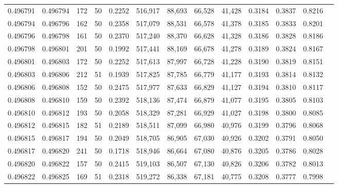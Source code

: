 \begin{tabular}{rrrrrrrrrrrrr}
0.496791 & 0.496794 &   172 &  50 &                                     0.2252 & 516,917 &  88,693 &  66,528 &  41,428 & 0.3184 & 0.3837 & 0.8216 \\
0.496794 & 0.496796 &   162 &  50 &                                     0.2358 & 517,079 &  88,531 &  66,578 &  41,378 & 0.3185 & 0.3833 & 0.8201 \\
0.496796 & 0.496798 &   161 &  50 &                                     0.2370 & 517,240 &  88,370 &  66,628 &  41,328 & 0.3186 & 0.3828 & 0.8186 \\
0.496798 & 0.496801 &   201 &  50 &                                     0.1992 & 517,441 &  88,169 &  66,678 &  41,278 & 0.3189 & 0.3824 & 0.8167 \\
0.496801 & 0.496803 &   172 &  50 &                                     0.2252 & 517,613 &  87,997 &  66,728 &  41,228 & 0.3190 & 0.3819 & 0.8151 \\
0.496803 & 0.496806 &   212 &  51 &                                     0.1939 & 517,825 &  87,785 &  66,779 &  41,177 & 0.3193 & 0.3814 & 0.8132 \\
0.496806 & 0.496808 &   152 &  50 &                                     0.2475 & 517,977 &  87,633 &  66,829 &  41,127 & 0.3194 & 0.3810 & 0.8117 \\
0.496808 & 0.496810 &   159 &  50 &                                     0.2392 & 518,136 &  87,474 &  66,879 &  41,077 & 0.3195 & 0.3805 & 0.8103 \\
0.496810 & 0.496812 &   193 &  50 &                                     0.2058 & 518,329 &  87,281 &  66,929 &  41,027 & 0.3198 & 0.3800 & 0.8085 \\
0.496812 & 0.496815 &   182 &  51 &                                     0.2189 & 518,511 &  87,099 &  66,980 &  40,976 & 0.3199 & 0.3796 & 0.8068 \\
0.496815 & 0.496817 &   194 &  50 &                                     0.2049 & 518,705 &  86,905 &  67,030 &  40,926 & 0.3202 & 0.3791 & 0.8050 \\
0.496817 & 0.496820 &   241 &  50 &                                     0.1718 & 518,946 &  86,664 &  67,080 &  40,876 & 0.3205 & 0.3786 & 0.8028 \\
0.496820 & 0.496822 &   157 &  50 &                                     0.2415 & 519,103 &  86,507 &  67,130 &  40,826 & 0.3206 & 0.3782 & 0.8013 \\
0.496822 & 0.496825 &   169 &  51 &                                     0.2318 & 519,272 &  86,338 &  67,181 &  40,775 & 0.3208 & 0.3777 & 0.7998 \\

\end{tabular}
